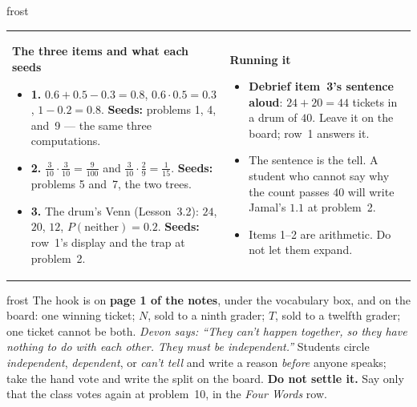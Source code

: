 \documentclass[10pt]{article}
\begin{document}
\begin{fixedskillbox}{frost}
\begin{tabularx}{\linewidth}{@{}X X@{}}
\begin{minipage}[t]{\linewidth}\vspace{0pt}
    \textbf{The three items and what each seeds}
    \begin{itemize}[leftmargin=1.1em, itemsep=1pt, topsep=2pt]
      \item \textbf{1.} $0.6 + 0.5 - 0.3 = 0.8$, $0.6 \cdot 0.5 = 0.3$, $1 - 0.2 = 0.8$.
            \textbf{Seeds:} problems 1, 4, and~9 --- the same three computations.
      \item \textbf{2.} $\frac{3}{10} \cdot \frac{3}{10} = \frac{9}{100}$ and
            $\frac{3}{10} \cdot \frac{2}{9} = \frac{1}{15}$. \textbf{Seeds:} problems 5 and~7,
            the two trees.
      \item \textbf{3.} The drum's Venn (Lesson~3.2): $24$, $20$, $12$, $P(\text{neither}) =
            0.2$. \textbf{Seeds:} row~1's display and the trap at problem~2.
    \end{itemize}
\end{minipage}
&
\begin{minipage}[t]{\linewidth}\vspace{0pt}
    \textbf{Running it}
    \begin{itemize}[leftmargin=1.1em, itemsep=1pt, topsep=2pt]
      \item \textbf{Debrief item~3's sentence aloud}: $24 + 20 = 44$ tickets in a drum of $40$.
            Leave it on the board; row~1 answers it.
      \item The sentence is the tell. A student who cannot say why the count passes $40$ will
            write Jamal's $1.1$ at problem~2.
      \item Items 1--2 are arithmetic. Do not let them expand.
    \end{itemize}
\end{minipage}
\end{tabularx}
\end{fixedskillbox}

\boxguard
\begin{skillbox}{frost}
The hook is on \textbf{page 1 of the notes}, under the vocabulary box, and on the board: one
winning ticket; $N$, sold to a ninth grader; $T$, sold to a twelfth grader; one ticket cannot be
both. \textit{Devon says: ``They can't happen together, so they have nothing to do with each
other. They must be independent.''} Students circle \emph{independent}, \emph{dependent}, or
\emph{can't tell} and write a reason \emph{before} anyone speaks; take the hand vote and write
the split on the board. \textbf{Do not settle it.} Say only that the class votes again at
problem~10, in the \emph{Four Words} row.
\end{skillbox}
\end{document}
